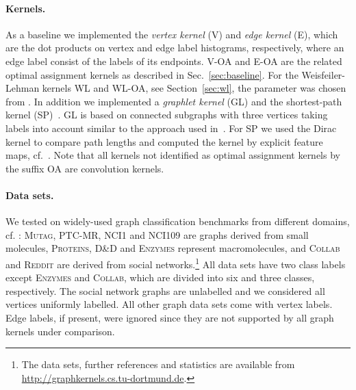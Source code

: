 \documentclass{article}
\begin{document}
\paragraph{Kernels.}
As a baseline we implemented the \emph{vertex kernel} (V) and \emph{edge 
kernel} (E), which are the dot products on vertex and edge label 
histograms, respectively, where an edge label consist of the labels of its
endpoints. V-OA and E-OA are the related optimal assignment kernels as 
described in Sec.~\ref{sec:baseline}. For the Weisfeiler-Lehman kernels WL and 
WL-OA, see Section~\ref{sec:wl}, the parameter  was chosen from .
In addition we implemented a \emph{graphlet kernel} (GL) and the shortest-path 
kernel (SP)~\cite{Borgwardt2005}.
GL is based on connected subgraphs with three vertices taking labels into account 
similar to the approach used in~\cite{Shervashidze2011}. For SP we used the Dirac 
kernel to compare path lengths and computed the kernel by explicit feature maps, cf.~\cite{Shervashidze2011}. 
Note that all kernels not identified as optimal assignment kernels by the suffix 
OA are convolution kernels.

\paragraph{Data sets.}
We tested on widely-used graph classification benchmarks from different domains, 
cf. \cite{Borgwardt2005a,Vishwanathan2010,Shervashidze2011,Yanardag2015a}: 
\textsc{Mutag}, \textsc{PTC-MR}, \textsc{NCI1} and \textsc{NCI109} are graphs 
derived from small molecules, \textsc{Proteins}, \textsc{D\&D} and \textsc{Enzymes} 
represent macromolecules, and \textsc{Collab} and \textsc{Reddit} are derived 
from social networks.\footnote{The data sets, further references and statistics 
are available from \url{http://graphkernels.cs.tu-dortmund.de}.}
All data sets have two class labels except \textsc{Enzymes} and \textsc{Collab}, 
which are divided into six and three classes, respectively.
The social network graphs are unlabelled and we considered all vertices uniformly 
labelled. All other graph data sets come with vertex labels.
Edge labels, if present, were ignored since they are not supported by all graph 
kernels under comparison.
\end{document}
